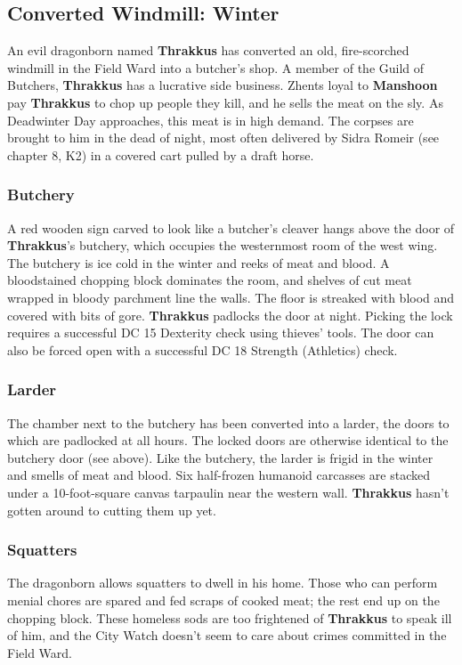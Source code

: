 \documentclass[10pt,a4paper,twoside,twocolumn,openany,nodeprecatedcode]{dndbook}
\begin{document}
\subsection{Converted Windmill: Winter}
An evil dragonborn named \textbf{Thrakkus} has converted an old, fire-scorched windmill in the Field Ward into a butcher's shop. A member of the Guild of Butchers, \textbf{Thrakkus} has a lucrative side business. Zhents loyal to \textbf{Manshoon} pay \textbf{Thrakkus} to chop up people they kill, and he sells the meat on the sly. As Deadwinter Day approaches, this meat is in high demand. The corpses are brought to him in the dead of night, most often delivered by Sidra Romeir (see chapter 8, K2) in a covered cart pulled by a draft horse.
\subsubsection{Butchery}
A red wooden sign carved to look like a butcher's cleaver hangs above the door of \textbf{Thrakkus}'s butchery, which occupies the westernmost room of the west wing. The butchery is ice cold in the winter and reeks of meat and blood. A bloodstained chopping block dominates the room, and shelves of cut meat wrapped in bloody parchment line the walls. The floor is streaked with blood and covered with bits of gore.
\textbf{Thrakkus} padlocks the door at night. Picking the lock requires a successful DC 15 Dexterity check using thieves' tools. The door can also be forced open with a successful DC 18 Strength (Athletics) check.
\subsubsection{Larder}
The chamber next to the butchery has been converted into a larder, the doors to which are padlocked at all hours. The locked doors are otherwise identical to the butchery door (see above). Like the butchery, the larder is frigid in the winter and smells of meat and blood. Six half-frozen humanoid carcasses are stacked under a 10-foot-square canvas tarpaulin near the western wall. \textbf{Thrakkus} hasn't gotten around to cutting them up yet.
\subsubsection{Squatters}
The dragonborn allows squatters to dwell in his home. Those who can perform menial chores are spared and fed scraps of cooked meat; the rest end up on the chopping block. These homeless sods are too frightened of \textbf{Thrakkus} to speak ill of him, and the City Watch doesn't seem to care about crimes committed in the Field Ward.
\end{document}
